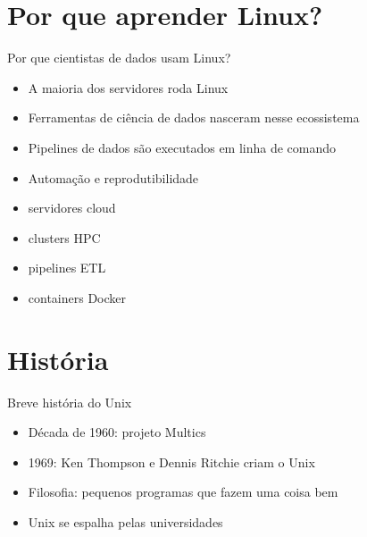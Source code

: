 \documentclass[xcolor=dvipsnames,t,aspectratio=169]{beamer}
\newcommand{\highlight}[1]{{\color{nes_dark_orange} #1}}
\begin{document}
\section{Por que aprender Linux?}

\begin{frame}[c]{Por que cientistas de dados usam Linux?}

\begin{itemize}

\item A maioria dos servidores roda \highlight{Linux}

\item Ferramentas de ciência de dados nasceram nesse ecossistema

\item Pipelines de dados são executados em \highlight{linha de comando}

\item Automação e reprodutibilidade

\end{itemize}

\begin{display}[Exemplos]
\begin{itemize}

\item servidores cloud

\item clusters HPC

\item pipelines ETL

\item containers Docker

\end{itemize}
\end{display}

\end{frame}

\section{História}

\begin{frame}[c]{Breve história do Unix}

\begin{itemize}

\item Década de 1960: projeto \highlight{Multics}

\item 1969: Ken Thompson e Dennis Ritchie criam o \highlight{Unix}

\item Filosofia: pequenos programas que fazem \highlight{uma coisa bem}

\item Unix se espalha pelas universidades

\end{itemize}

\end{frame}
\end{document}
